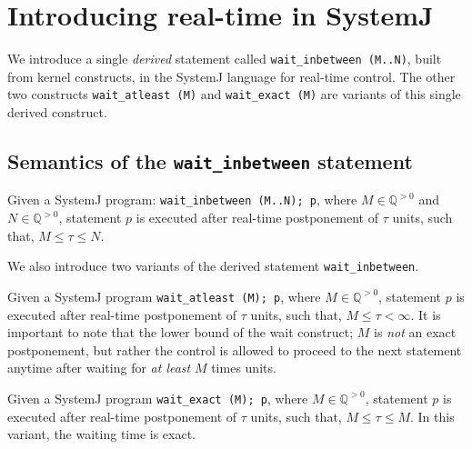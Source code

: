 \section{Introducing real-time in SystemJ}
\label{sec:intr-real-time}

We introduce a single \textit{derived} statement called
\texttt{wait\-\_inbetween (M..N)}, built from kernel constructs, in the
SystemJ language for real-time control. The other two constructs
\texttt{wait\-\_atleast (M)} and \mbox{\texttt{wait\_exact (M)}} are
variants of this single derived construct.



\subsection{Semantics of the \texttt{wait\_inbetween} statement}
\label{sec:semant-delay-stat}


Given a  SystemJ program:  \texttt{wait\_inbetween (M..N); p},  where $M
\in  \mathbb{Q}^{>0}$  and $N  \in  \mathbb{Q}^{>0}$,  statement $p$  is
executed after  real-time postponement  of $\tau$  units, such  that, $M
\leq \tau \leq N$.

We also introduce two variants of the derived statement
\texttt{wait\_inbetween}.
\begin{enumerate*}
\item Given a SystemJ program \texttt{wait\_atleast (M); p}, where $M
  \in \mathbb{Q}^{>0}$, statement $p$ is executed after real-time
  postponement of $\tau$ units, such that, $M \leq \tau < \infty$. It is
  important to note that the lower bound of the wait construct; $M$ is
  \textit{not} an exact postponement, but rather the control is allowed
  to proceed to the next statement anytime after waiting for \textit{at
    least} $M$ times units.
\item Given a SystemJ program \texttt{wait\_exact (M); p}, where $M \in
  \mathbb{Q}^{>0}$, statement $p$ is executed after real-time
  postponement of $\tau$ units, such that, $M \leq \tau \leq M$. In this
  variant, the waiting time is exact.
\end{enumerate*}

